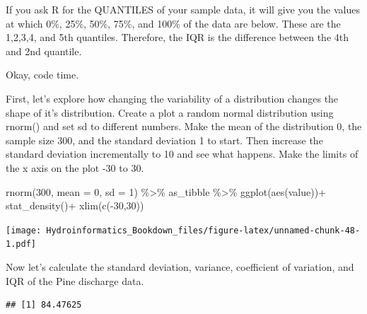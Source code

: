 \documentclass[
]{book}
\newenvironment{Shaded}{\begin{snugshade}}{\end{snugshade}}
\newcommand{\AttributeTok}[1]{\textcolor[rgb]{0.77,0.63,0.00}{#1}}
\newcommand{\CommentTok}[1]{\textcolor[rgb]{0.56,0.35,0.01}{\textit{#1}}}
\newcommand{\DecValTok}[1]{\textcolor[rgb]{0.00,0.00,0.81}{#1}}
\newcommand{\FunctionTok}[1]{\textcolor[rgb]{0.00,0.00,0.00}{#1}}
\newcommand{\NormalTok}[1]{#1}
\newcommand{\SpecialCharTok}[1]{\textcolor[rgb]{0.00,0.00,0.00}{#1}}
\begin{document}
If you ask R for the QUANTILES of your sample data, it will give you the values at which 0\%, 25\%, 50\%, 75\%, and 100\% of the data are below. These are the 1,2,3,4, and 5th quantiles. Therefore, the IQR is the difference between the 4th and 2nd quantile.

Okay, code time.

First, let's explore how changing the variability of a distribution changes the shape of it's distribution. Create a plot a random normal distribution using rnorm() and set sd to different numbers. Make the mean of the distribution 0, the sample size 300, and the standard deviation 1 to start. Then increase the standard deviation incrementally to 10 and see what happens. Make the limits of the x axis on the plot -30 to 30.

\begin{Shaded}
\begin{Highlighting}[]
\FunctionTok{rnorm}\NormalTok{(}\DecValTok{300}\NormalTok{, }\AttributeTok{mean =} \DecValTok{0}\NormalTok{, }\AttributeTok{sd =} \DecValTok{1}\NormalTok{) }\SpecialCharTok{\%\textgreater{}\%}\NormalTok{ as\_tibble }\SpecialCharTok{\%\textgreater{}\%}
  \FunctionTok{ggplot}\NormalTok{(}\FunctionTok{aes}\NormalTok{(value))}\SpecialCharTok{+}
  \FunctionTok{stat\_density}\NormalTok{()}\SpecialCharTok{+}
  \FunctionTok{xlim}\NormalTok{(}\FunctionTok{c}\NormalTok{(}\SpecialCharTok{{-}}\DecValTok{30}\NormalTok{,}\DecValTok{30}\NormalTok{))}
\end{Highlighting}
\end{Shaded}

\texttt{[image: Hydroinformatics\_Bookdown\_files/figure-latex/unnamed-chunk-48-1.pdf]}

Now let's calculate the standard deviation, variance, coefficient of variation, and IQR of the Pine discharge data.

\begin{Shaded}
\end{Shaded}

\begin{verbatim}
## [1] 84.47625
\end{verbatim}

\begin{Shaded}
\end{Shaded}
\end{document}
